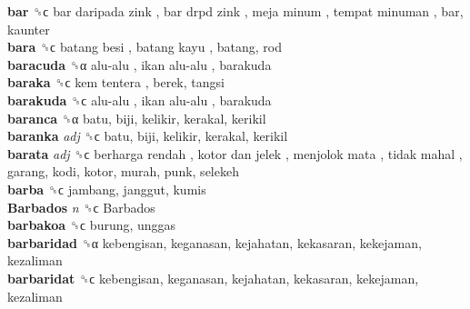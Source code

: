 \textbf{bar} ␝ϲ   bar daripada zink ,  bar drpd zink ,  meja minum ,  tempat minuman , bar, kaunter  \\
\textbf{bara} ␝ϲ   batang besi ,  batang kayu , batang, rod  \\
\textbf{baracuda} ␝α   alu-alu ,  ikan alu-alu , barakuda  \\
\textbf{baraka} ␝ϲ   kem tentera , berek, tangsi  \\
\textbf{barakuda} ␝ϲ   alu-alu ,  ikan alu-alu , barakuda  \\
\textbf{baranca} ␝α  batu, biji, kelikir, kerakal, kerikil  \\
\textbf{baranka} \emph{adj}  ␝ϲ  batu, biji, kelikir, kerakal, kerikil  \\
\textbf{barata} \emph{adj}  ␝ϲ   berharga rendah ,  kotor dan jelek ,  menjolok mata ,  tidak mahal , garang, kodi, kotor, murah, punk, selekeh  \\
\textbf{barba} ␝ϲ  jambang, janggut, kumis  \\
\textbf{Barbados} \emph{n}  ␝ϲ   Barbados   \\
\textbf{barbakoa} ␝ϲ  burung, unggas  \\
\textbf{barbaridad} ␝α  kebengisan, keganasan, kejahatan, kekasaran, kekejaman, kezaliman  \\
\textbf{barbaridat} ␝ϲ  kebengisan, keganasan, kejahatan, kekasaran, kekejaman, kezaliman  \\
